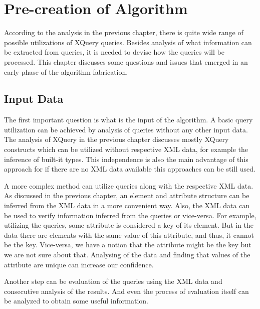 \chapter{Pre-creation of Algorithm}
According to the analysis in the previous chapter, there is quite wide range of possible utilizations of XQuery queries. Besides analysis of what information can be extracted from queries, it is needed to devise how the queries will be processed. This chapter discusses some questions and issues that emerged in an early phase of the algorithm fabrication.

\section{Input Data}
The first important question is what is the input of the algorithm. A basic query utilization can be achieved by analysis of queries without any other input data. The analysis of XQuery in the previous chapter discusses mostly XQuery constructs which can be utilized without respective XML data, for example the inference of built-it types. This independence is also the main advantage of this approach for if there are no XML data available this approaches can be still used. 

A more complex method can utilize queries along with the respective XML data. As discussed in the previous chapter, an element and attribute structure can be inferred from the XML data in a more convenient way. Also, the XML data can be used to verify information inferred from the queries or vice-versa. For example, utilizing the queries, some attribute is considered a key of its element. But in the data there are elements with the same value of this attribute, and thus, it cannot be the key. Vice-versa, we have a notion that the attribute might be the key but we are not sure about that. Analysing of the data and finding that values of the attribute are unique can increase our confidence. 

Another step can be evaluation of the queries using the XML data and consecutive analysis of the results. And even the process of evaluation itself can be analyzed to obtain some useful information. 


